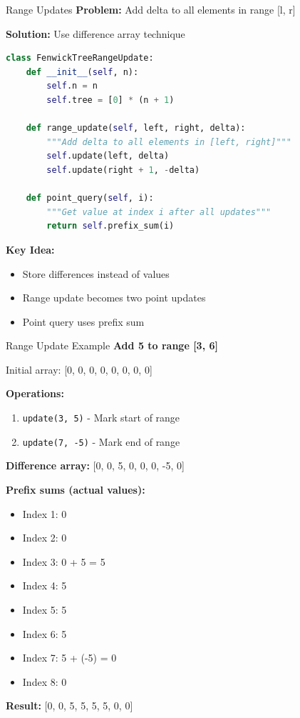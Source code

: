 \documentclass[aspectratio=169]{beamer}
\begin{document}
\begin{frame}[fragile]{Range Updates}
  \textbf{Problem:} Add delta to all elements in range [l, r]

  \vspace{0.3cm}
  \textbf{Solution:} Use difference array technique

  \begin{lstlisting}[language=Python, basicstyle=\ttfamily\footnotesize]
class FenwickTreeRangeUpdate:
    def __init__(self, n):
        self.n = n
        self.tree = [0] * (n + 1)

    def range_update(self, left, right, delta):
        """Add delta to all elements in [left, right]"""
        self.update(left, delta)
        self.update(right + 1, -delta)

    def point_query(self, i):
        """Get value at index i after all updates"""
        return self.prefix_sum(i)
  \end{lstlisting}

  \vspace{0.5cm}
  \textbf{Key Idea:}
  \begin{itemize}
    \item Store differences instead of values
    \item Range update becomes two point updates
    \item Point query uses prefix sum
  \end{itemize}
\end{frame}

\begin{frame}{Range Update Example}
  \textbf{Add 5 to range [3, 6]}

  \vspace{0.3cm}
  Initial array: [0, 0, 0, 0, 0, 0, 0, 0]

  \vspace{0.5cm}
  \textbf{Operations:}
  \begin{enumerate}
    \item \texttt{update(3, 5)} - Mark start of range
    \item \texttt{update(7, -5)} - Mark end of range
  \end{enumerate}

  \vspace{0.5cm}
  \textbf{Difference array:} [0, 0, 5, 0, 0, 0, -5, 0]

  \vspace{0.3cm}
  \textbf{Prefix sums (actual values):}
  \begin{itemize}
    \item Index 1: 0
    \item Index 2: 0
    \item Index 3: 0 + 5 = 5
    \item Index 4: 5
    \item Index 5: 5
    \item Index 6: 5
    \item Index 7: 5 + (-5) = 0
    \item Index 8: 0
  \end{itemize}

  \textbf{Result:} [0, 0, 5, 5, 5, 5, 0, 0] \checkmark
\end{frame}
\end{document}
